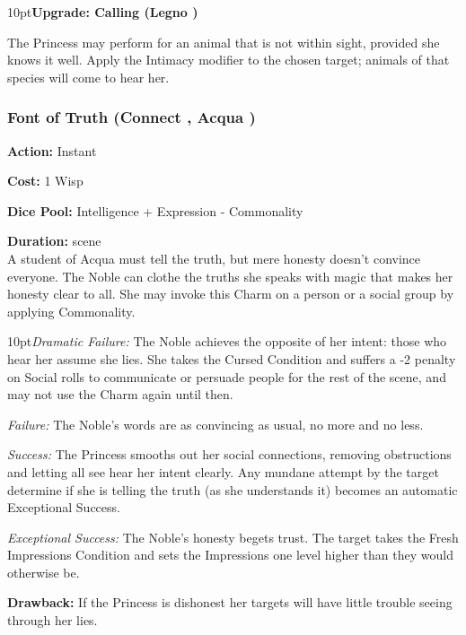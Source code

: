 \begin{myindentpar}{10pt}\textbf{Upgrade: Calling (Legno  \textbullet\textbullet\textbullet)}

The Princess may perform for an animal that is not within sight, provided she knows it well. Apply the Intimacy modifier to the chosen target; animals of that species will come to hear her.\end{myindentpar}

\subsubsection*{Font of Truth (Connect \textbullet\textbullet\textbullet, Acqua \textbullet\textbullet)}

\noindent \textbf{Action:} Instant

\noindent \textbf{Cost:} 1 Wisp

\noindent \textbf{Dice Pool:} Intelligence + Expression - Commonality

\noindent \textbf{Duration:} scene \\

\noindent  A student of Acqua must tell the truth, but mere honesty doesn't convince everyone. The Noble can clothe the truths she speaks with magic that makes her honesty clear to all. She may invoke this Charm on a person or a social group by applying Commonality. 

\begin{myindentpar}{10pt}\emph{Dramatic Failure:} The Noble achieves the opposite of her intent: those who hear her assume she lies. She takes the Cursed Condition and suffers a -2 penalty on Social rolls to communicate or persuade people for the rest of the scene, and may not use the Charm again until then.
    
	\emph{Failure:} The Noble's words are as convincing as usual, no more and no less.
    
	\emph{Success:} The Princess smooths out her social connections, removing obstructions and letting all see hear her intent clearly. Any mundane attempt by the target determine if she is telling the truth (as she understands it) becomes an automatic Exceptional Success. 
    
	\emph{Exceptional Success:} The Noble's honesty begets trust. The target takes the Fresh Impressions Condition and sets the Impressions one level higher than they would otherwise be. \end{myindentpar}
	
\noindent \textbf{Drawback:} If the Princess is dishonest her targets will have little trouble seeing through her lies. 

